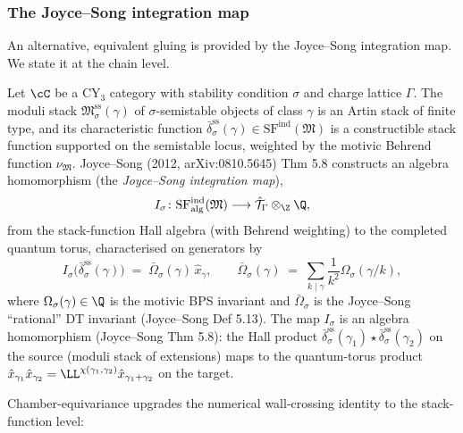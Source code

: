 \subsubsection{The Joyce--Song integration map}

An alternative, equivalent gluing is provided by the Joyce--Song integration
map. We state it at the chain level.

\begin{theorem}
 \label{thm:joyce-song-integration}
 Let $\cC$ be a CY$_3$ category with stability condition $\sigma$ and
 charge lattice $\Gamma$. The moduli stack
 $\mathfrak{M}_\sigma^{\mathrm{ss}}(\gamma)$ of $\sigma$-semistable objects
 of class $\gamma$ is an Artin stack of finite type, and its
 characteristic function $\bar{\delta}_\sigma^{\mathrm{ss}}(\gamma) \in
 \mathrm{SF}^{\mathrm{ind}}(\mathfrak{M})$ is a constructible stack
 function supported on the semistable locus, weighted by the motivic
 Behrend function $\nu_{\mathfrak{M}}$. Joyce--Song (2012, arXiv:0810.5645)
 Thm 5.8 constructs an algebra homomorphism (the \emph{Joyce--Song
 integration map}),
 \[
 I_\sigma \colon \mathrm{SF}^{\mathrm{ind}}_{\mathrm{alg}}(\mathfrak{M})
 \longrightarrow \hat{\mathcal{T}}_\Gamma \otimes_\Z \Q,
 \]
 from the stack-function Hall algebra (with Behrend weighting) to the
 completed quantum torus, characterised on generators by
 \[
 I_\sigma\!\big(\bar{\delta}_\sigma^{\mathrm{ss}}(\gamma)\big)
 \;=\; \bar{\Omega}_\sigma(\gamma)\, \hat{x}_\gamma,
 \qquad
 \bar{\Omega}_\sigma(\gamma) \;=\; \sum_{k \mid \gamma} \frac{1}{k^2}
 \Omega_\sigma(\gamma / k),
 \]
 where $\Omega_\sigma(\gamma) \in \Q$ is the motivic BPS invariant and
 $\bar{\Omega}_\sigma$ is the Joyce--Song ``rational'' DT invariant
 (Joyce--Song Def 5.13). The map $I_\sigma$ is an algebra homomorphism
 (Joyce--Song Thm 5.8): the Hall product
 $\bar{\delta}^{\mathrm{ss}}_\sigma(\gamma_1) \star
 \bar{\delta}^{\mathrm{ss}}_\sigma(\gamma_2)$ on the source (moduli stack
 of extensions) maps to the quantum-torus product
 $\hat{x}_{\gamma_1} \hat{x}_{\gamma_2} = \LL^{\chi(\gamma_1, \gamma_2)}
 \hat{x}_{\gamma_1 + \gamma_2}$ on the target.
\end{theorem}

Chamber-equivariance upgrades the numerical wall-crossing identity to
the stack-function level:

